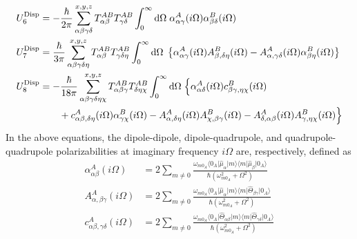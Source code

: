 \documentclass[b5paper,oneside,fleqn,11pt]{book}
\begin{document}
\begin{refsection}
\begin{subequations}
\begin{align}
  U^{\rm Disp}_6 &= - \frac{\hbar}{2\pi} \sum_{\alpha\beta\gamma\delta}^{x,y,z}
   T^{AB}_{\alpha\beta}T^{AB}_{\gamma\delta} \int_0^{\infty} {\rm d}\Omega \; 
    \alpha^A_{\alpha\gamma}(i\Omega)\alpha^B_{\beta\delta}(i\Omega) \label{e:edisp6}\\
  U^{\rm Disp}_7 &= \frac{\hbar}{3\pi} \sum_{\alpha\beta\gamma\delta\eta}^{x,y,z}
   T^{AB}_{\alpha\beta}T^{AB}_{\gamma\delta\eta} \int_0^{\infty} {\rm d}\Omega \; 
    \left\{ 
     \alpha^A_{\alpha\gamma}(i\Omega)A^B_{\beta,\delta\eta}(i\Omega) -
     A^A_{\alpha,\gamma\delta}(i\Omega)\alpha^B_{\beta\eta}(i\Omega) 
    \right\} \\
   U^{\rm Disp}_8 &= - \frac{\hbar}{18\pi} \sum_{\alpha\beta\gamma\delta\eta\chi}^{x,y,z}
   T^{AB}_{\alpha\beta\gamma}T^{AB}_{\delta\eta\chi} \int_0^{\infty} {\rm d}\Omega \; 
    \Big\{ 
      \alpha^A_{\alpha\delta}(i\Omega) c^B_{\beta\gamma,\eta\chi}(i\Omega) \nonumber \\  &\qquad+ 
      c^A_{\alpha\beta,\delta\eta}(i\Omega) \alpha^B_{\gamma\chi}(i\Omega) -
      A^A_{\alpha,\delta\eta}(i\Omega) A^B_{\chi,\beta\gamma}(i\Omega) -
      A^A_{\delta,\alpha\beta}(i\Omega) A^B_{\gamma,\eta\chi}(i\Omega)
   \Big\}
 \end{align}
\end{subequations}
%
In the above equations, the dipole\hyp{}dipole, dipole\hyp{}quadrupole, 
and quadrupole\hyp{}quadrupole polarizabilities at imaginary frequency 
$i\Omega$ are, respectively, defined as
%
\begin{subequations} \label{e:iomega-polarizabilities}
 \begin{align}
  \alpha^A_{\alpha\beta}(i\Omega) &= 2\sum_{m\neq 0} \frac{
\omega_{m0_A} 
\langle 0_A \lvert \hat{\mu}_{\alpha} \rvert m \rangle  \langle m \lvert \hat{\mu}_{\beta} \rvert 0_A \rangle 
}{\hbar \left( \omega_{m0_A}^2 + \Omega^2 \right)} \\
%
  A^A_{\alpha,\beta\gamma}(i\Omega) &= 2\sum_{m\neq 0} \frac{
\omega_{m0_A} 
\langle 0_A \lvert \hat{\mu}_{\alpha} \rvert m \rangle  \langle m \lvert \hat{\Theta}_{\beta\gamma} \rvert 0_A \rangle 
}{\hbar \left( \omega_{m0_A}^2 + \Omega^2 \right)} \\
%
  c^A_{\alpha\beta,\gamma\delta}(i\Omega) &= 2\sum_{m\neq 0} \frac{
\omega_{m0_A} 
\langle 0_A \lvert \hat{\Theta}_{\alpha\beta} \rvert m \rangle  \langle m \lvert \hat{\Theta}_{\gamma\delta} \rvert 0_A \rangle 
}{\hbar \left( \omega_{m0_A}^2 + \Omega^2 \right)}
 \end{align}
\end{subequations}

\end{refsection}
\end{document}
